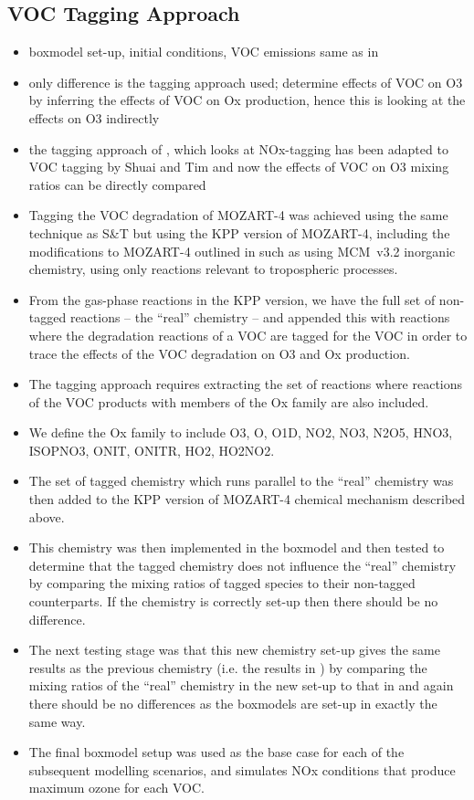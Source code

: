 \subsection{VOC Tagging Approach} \label{ss:O3_tagging}
\begin{itemize}
    \item boxmodel set-up, initial conditions, VOC emissions same as in \citet{Coates:2015}
    \item only difference is the tagging approach used; \citet{Coates:2015} determine effects of VOC on O3 by inferring the effects of VOC on Ox production, hence this is looking at the effects on O3 indirectly
    \item the tagging approach of \citet{Emmons:2012}, which looks at NOx-tagging has been adapted to VOC tagging by Shuai and Tim and now the effects of VOC on O3 mixing ratios can be directly compared
    \item Tagging the VOC degradation of MOZART-4 was achieved using the same technique as S\&T but using the KPP version of MOZART-4, including the modifications to MOZART-4 outlined in \citet{Coates:2015} such as using MCM~v3.2 inorganic chemistry, using only reactions relevant to tropospheric processes.
    \item From the gas-phase reactions in the KPP version, we have the full set of non-tagged reactions -- the ``real'' chemistry -- and appended this with reactions where the degradation reactions of a VOC are tagged for the VOC in order to trace the effects of the VOC degradation on O3 and Ox production.
    \item The tagging approach requires extracting the set of reactions where reactions of the VOC products with members of the Ox family are also included.
    \item We define the Ox family to include O3, O, O1D, NO2, NO3, N2O5, HNO3, ISOPNO3, ONIT, ONITR, HO2, HO2NO2.
    \item The set of tagged chemistry which runs parallel to the ``real'' chemistry was then added to the KPP version of MOZART-4 chemical mechanism described above.
    \item This chemistry was then implemented in the boxmodel and then tested to determine that the tagged chemistry does not influence the ``real'' chemistry by comparing the mixing ratios of tagged species to their non-tagged counterparts. If the chemistry is correctly set-up then there should be no difference.
    \item The next testing stage was that this new chemistry set-up gives the same results as the previous chemistry (i.e. the results in \citet{Coates:2015}) by comparing the mixing ratios of the ``real'' chemistry in the new set-up to that in \citet{Coates:2015} and again there should be no differences as the boxmodels are set-up in exactly the same way.
    \item The final boxmodel setup was used as the base case for each of the subsequent modelling scenarios, and simulates NOx conditions that produce maximum ozone for each VOC.
\end{itemize}

